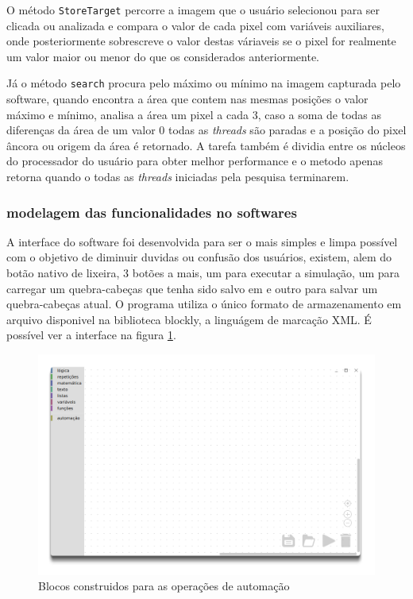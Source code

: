 \documentclass[tg]{mdtufsm}
\begin{document}
    O método \texttt{StoreTarget} percorre a imagem que o usuário selecionou para ser clicada ou analizada e compara o valor de cada pixel com variáveis auxiliares, onde posteriormente sobrescreve o valor destas váriaveis se o pixel for realmente um valor maior ou menor do que os considerados anteriormente.

    Já o método \texttt{search} procura pelo máximo ou mínimo na imagem capturada pelo software, quando encontra a área que contem nas mesmas posições o valor máximo e mínimo, analisa a área um pixel a cada 3, caso a soma de todas as diferenças da área de um valor 0 todas as \emph{threads} são paradas e a posição do pixel âncora ou origem da área é retornado. A tarefa também é dividia entre os núcleos do processador do usuário para obter melhor performance e o metodo apenas retorna quando o todas as \emph{threads} iniciadas pela pesquisa terminarem.

    \subsubsection {modelagem das funcionalidades no softwares}

    A interface do software foi desenvolvida para ser o mais simples e limpa possível com o objetivo de diminuir duvidas ou confusão dos usuários, existem, alem do botão nativo de lixeira, 3 botões a mais, um para executar a simulação, um para carregar um quebra-cabeças que tenha sido salvo em e outro para salvar um quebra-cabeças atual. O programa utiliza o único formato de armazenamento em arquivo disponivel na biblioteca blockly, a linguágem de marcação XML. É possível ver a interface na figura \ref{fig:app}.

    \begin{figure}[!htb]
        {\centering
        \includegraphics[width=1.0\textwidth]{imagens/app.png}
        \caption{Blocos construidos para as operações de automação}
        \label{fig:app}}
    \end{figure}
\end{document}
